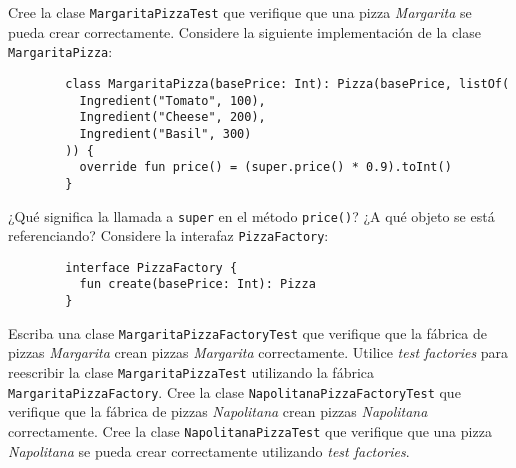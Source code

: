 \begin{Exercise}[title={La Pizzería}]
    \Question Cree la clase \texttt{MargaritaPizzaTest} que verifique que una pizza \textit{Margarita}
      se pueda crear correctamente.
    \Question Considere la siguiente implementación de la clase \texttt{MargaritaPizza}:
      \begin{verbatim}
        class MargaritaPizza(basePrice: Int): Pizza(basePrice, listOf(
          Ingredient("Tomato", 100),
          Ingredient("Cheese", 200),
          Ingredient("Basil", 300)
        )) {
          override fun price() = (super.price() * 0.9).toInt()
        }
      \end{verbatim}
      ¿Qué significa la llamada a \texttt{super} en el método \texttt{price()}?
      ¿A qué objeto se está referenciando?
    \Question Considere la interafaz \texttt{PizzaFactory}:
      \begin{verbatim}
        interface PizzaFactory {
          fun create(basePrice: Int): Pizza
        }
      \end{verbatim}
      Escriba una clase \texttt{MargaritaPizzaFactoryTest} que verifique que la fábrica de pizzas
      \textit{Margarita} crean pizzas \textit{Margarita} correctamente.
    \Question Utilice \textit{test factories} para reescribir la clase \texttt{MargaritaPizzaTest}
      utilizando la fábrica \texttt{MargaritaPizzaFactory}.
    \Question Cree la clase \texttt{NapolitanaPizzaFactoryTest} que verifique que la fábrica de
      pizzas \textit{Napolitana} crean pizzas \textit{Napolitana} correctamente.
    \Question Cree la clase \texttt{NapolitanaPizzaTest} que verifique que una pizza
      \textit{Napolitana} se pueda crear correctamente utilizando \textit{test factories}.
  \end{Exercise}
